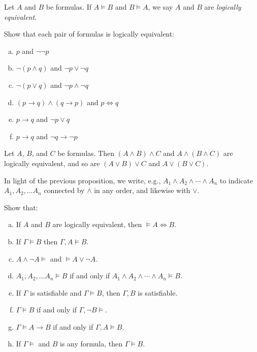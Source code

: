\documentclass{article}
\begin{document}
\begin{definition}
    Let $A$ and $B$ be formulas. If $A \models B$ and $B \models A$, we say $A$ and $B$ are \emph{logically equivalent}.
\end{definition}

\begin{prob}{4.2}
    Show that each pair of formulas is logically equivalent:
    \begin{multicols}{2}
    \begin{enumerate}[a)]
    \item $p$ and $\neg \neg p$
    \item $\neg (p \wedge q)$ and $\neg p \vee \neg q$
    \item $\neg (p \vee q)$ and $\neg p \wedge \neg q$
    \item $(p \to q) \wedge (q \to p)$ and $p \iff q$
    \item $p \to q$ and $\neg p \vee q$
    \item $p \to q$ and $\neg q \to \neg p$
    \end{enumerate}
    \end{multicols}
\end{prob}

\begin{proposition}
    Let $A$, $B$, and $C$ be formulas. Then $(A \wedge B) \wedge C$ and $A \wedge (B \wedge C)$ are logically equivalent, and so are $(A \vee B) \vee C$ and $A \vee (B \vee C)$.
\end{proposition}

\begin{notation}
    In light of the previous proposition, we write, e.g., $A_1 \wedge A_2 \wedge \cdots \wedge A_n$ to indicate $A_1, A_2, \dots A_n$ connected by $\wedge$ in any order, and likewise with $\vee$. 
\end{notation}

\begin{prob}{4.3}
    Show that:
    \begin{enumerate}[a)]
    \item If $A$ and $B$ are logically equivalent, then $\models A \iff B$.
    \item If $\Gamma \models B$ then $\Gamma, A \models B$.
    \item $A \wedge \neg A \models$ and $\models A \vee \neg A$.
    \item $A_1, A_2, \dots A_n \models B$ if and only if $A_1 \wedge A_2 \wedge \cdots \wedge A_n \models B$.
    \item If $\Gamma$ is satisfiable and $\Gamma \models B$, then $\Gamma, B$ is satisfiable.
    \item $\Gamma \models B$ if and only if $\Gamma, \neg B \models$.
    \item $\Gamma \models A \to B$ if and only if $\Gamma, A \models B$.
    \item If $\Gamma \models$ and $B$ is any formula, then $\Gamma \models B$.
    \end{enumerate}
\end{prob}
\end{document}
